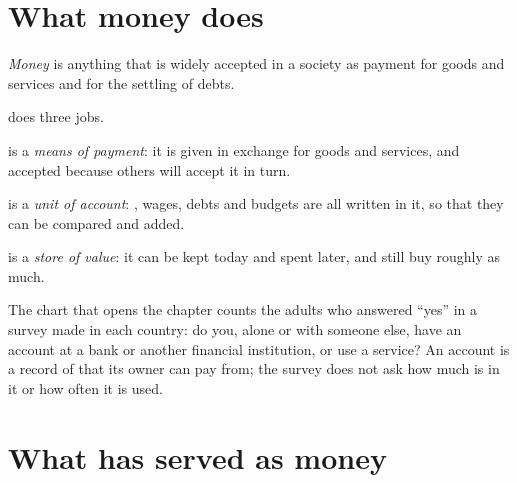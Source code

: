 \section{What money does}

\begin{definition}[Money]\label{def:g7:money:money}
\emph{Money} is anything that is widely accepted in a society as payment
for goods and services and for the settling of debts.
\end{definition}

 does three jobs.

\begin{definition}\label{def:g7:money:means-of-payment}
 is a \emph{means of payment}: it is given in exchange for
goods and services, and accepted because others will accept it in turn.
\end{definition}

\begin{definition}\label{def:g7:money:unit-of-account}
 is a \emph{unit of account}: , wages, debts and
budgets are all written in it, so that they can be compared and added.
\end{definition}

\begin{definition}\label{def:g7:money:store-of-value}
 is a \emph{store of value}: it can be kept today and spent
later, and still buy roughly as much.
\end{definition}

\begin{measure}[An account]
The chart that opens the chapter counts the adults who answered ``yes'' in a survey made in
each country: do you, alone or with someone else, have an account at a
bank or another financial institution, or use a  service? An account is a
record of  that its owner can pay from; the survey does not ask how much is in it
or how often it is used.
\end{measure}

\section{What has served as money}


